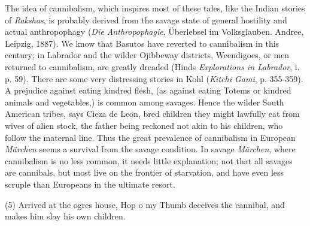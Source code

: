 \documentclass[14pt,a4paper]{memoir}
\begin{document}
The idea of cannibalism, which inspires most of these tales, like the
Indian stories of \emph{Rakshas}, is probably derived from the savage
state of general hostility and actual anthropophagy (\emph{Die
Anthropophagie}, Überlebsel im Volksglauben.\textquotesingle{} Andree,
Leipzig, 1887). We know that Basutos have reverted to cannibalism in
this century; in Labrador and the wilder Ojibbeway districts,
Weendigoes, or men returned to cannibalism, are greatly dreaded
(Hind\textquotesingle s \emph{Explorations in Labrador}, i. p. 59).
There are some very distressing stories in Kohl (\emph{Kitchi Gami}, p.
355-359). A prejudice against eating kindred flesh, (as against eating
Totems or kindred animals and vegetables,) is common among savages.
Hence the wilder South American tribes, says Cieza de Leon, bred
children they might lawfully eat from wives of alien stock, the father
being reckoned not akin to his children, who follow the maternal line.
Thus the great prevalence of cannibalism in European \emph{Märchen}
seems a survival from the savage condition. In savage \emph{Märchen},
where cannibalism is no less common, it needs little explanation; not
that all savages are cannibals, but most live on the frontier of
starvation, and have even less scruple than Europeans in the ultimate
resort.

(5) Arrived at the ogre\textquotesingle s house, Hop o\textquotesingle{}
my Thumb deceives the cannibal, and makes him slay his own children.
\end{document}
